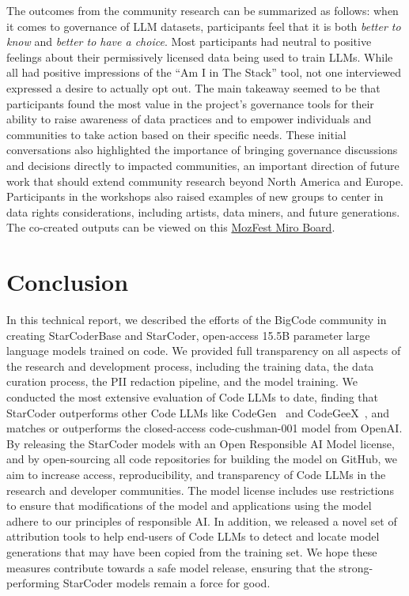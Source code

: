 The outcomes from the community research can be summarized as follows: when it comes to governance of LLM datasets, participants feel that it is both \emph{better to know} and \emph{better to have a choice}. Most participants had neutral to positive feelings about their permissively licensed data being used to train LLMs. While all had positive impressions of the ``Am I in The Stack'' tool, not one interviewed expressed a desire to actually opt out. The main takeaway seemed to be that participants found the most value in the project's governance tools for their ability to raise awareness of data practices and to empower individuals and communities to take action based on their specific needs. These initial conversations also highlighted the importance of bringing governance discussions and decisions directly to impacted communities, an important direction of future work that should extend community research beyond North America and Europe. Participants in the workshops also raised examples of new groups to center in data rights considerations, including artists, data miners, and future generations. The co-created outputs can be viewed on this \href{https://github.com/bigcode-project/bigcode-analysis/blob/main/community_research/mozfest.pdf}{MozFest Miro Board}.

\section{Conclusion}
In this technical report, we described the efforts of the BigCode community in creating StarCoderBase and StarCoder, open-access 15.5B parameter large language models trained on code. We provided full transparency on all aspects of the research and development process, including the training data, the data curation process, the PII redaction pipeline, and the model training.  We conducted the most extensive evaluation of Code LLMs to date, finding that StarCoder outperforms other Code LLMs like CodeGen~\citep{nijkamp:codegen} and CodeGeeX~\citep{qinkai:codegeex},  and matches or outperforms the closed-access code-cushman-001 model from OpenAI. By releasing the StarCoder models with an Open Responsible AI Model license, and by open-sourcing all code repositories for building the model on GitHub, we aim to increase access, reproducibility, and transparency of Code LLMs in the research and developer communities. The model license includes use restrictions to ensure that modifications of the model and applications using the model adhere to our principles of responsible AI. In addition, we released a novel set of attribution tools to help end-users of Code LLMs to detect and locate model generations that may have been copied from the training set. We hope these measures contribute towards a safe model release, ensuring that the strong-performing StarCoder models remain a force for good.

